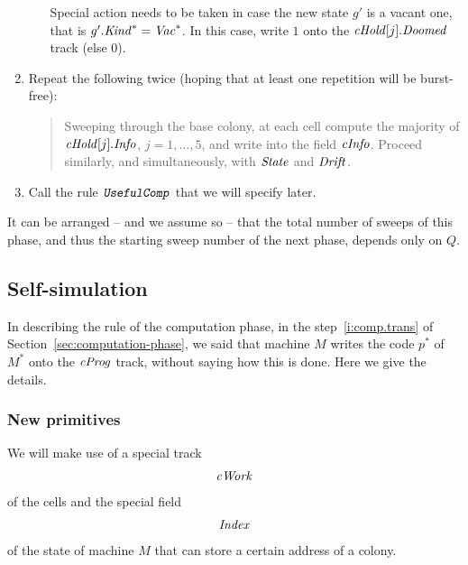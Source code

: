 \documentclass[12pt]{memoir}
\newcommand{\fld}[1]{\ensuremath{\textit{#1\/}}}
\newcommand{\rul}[1]{\ensuremath{\texttt{\slshape #1\/}}}
\newcommand{\Vacant}{\mathit{Vac}}
\newcommand{\Drift}{\fld{Drift}}
\newcommand{\Doomed}{\fld{Doomed}}
\newcommand{\cHold}{\fld{cHold}}
\newcommand{\Index}{\fld{Index}}
\newcommand{\Info}{\fld{Info}}
\newcommand{\cInfo}{\fld{cInfo}}
\newcommand{\Kind}{\fld{Kind}}
\newcommand{\cProg}{\fld{cProg}}
\newcommand{\State}{\fld{State}}
\newcommand{\cWork}{\fld{cWork}}
\newcommand{\UsefulComp}{\rul{UsefulComp}}
\begin{document}
\begin{enumerate}
\begin{enumerate}
              Special action needs to be taken in case 
              the new state \( g' \) is a vacant one, that is 
              \( g'.\Kind^{*}=\Vacant^{*} \).
              In this case, write \( 1 \) onto the \( \cHold[j].\Doomed \) track (else 0).

        \end{enumerate}

      \item Repeat the following twice (hoping that at least
        one repetition will be burst-free):

          \begin{quote}
            Sweeping through the base colony,
            at each cell compute the majority of \( \cHold[j].\Info \), \( j=1,\dots,5 \),
            and write into the field \( \cInfo \).
            Proceed similarly, and simultaneously, with \( \State \) and \( \Drift \).
          \end{quote}

       \item Call the rule \( \UsefulComp \) that we will specify later.
  \end{enumerate}

It can be arranged -- and we assume so -- that the total number of sweeps of this
phase, and thus the starting sweep number of the next phase,
depends only on \( Q \).

\subsection{Self-simulation}\label{sec:self-simulation}

In describing the rule of the computation phase,
in the step~\ref{i:comp.trans} of Section~\ref{sec:computation-phase},
we said that machine \( M \) writes the code \( p^{*} \)
of \( M^{*} \) onto the \( \cProg \) track, without saying how this is done.
Here we give the details.

\subsubsection{New primitives}

We will make use of a special track
\begin{align*}
   \cWork
 \end{align*}
of the cells and the special field
\begin{align*}
   \Index
 \end{align*}
of the state of machine \( M \) that can store a certain address of a colony.
\end{document}
